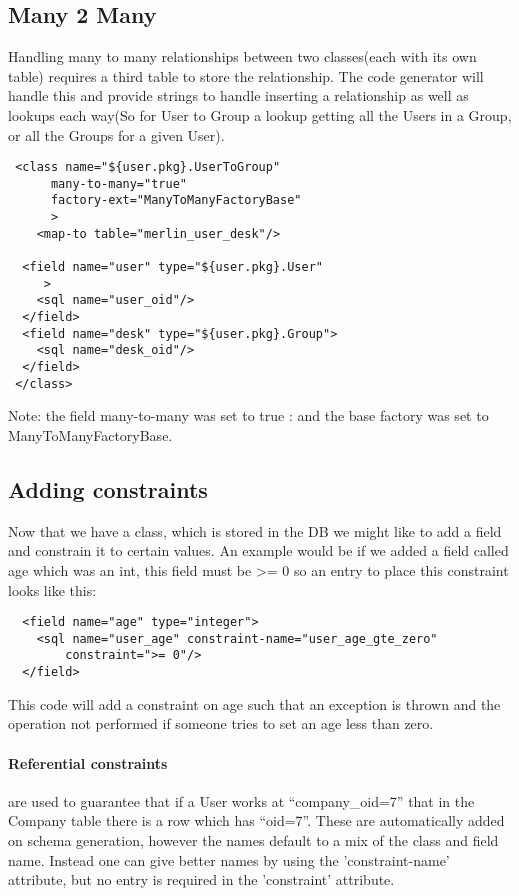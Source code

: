 \documentclass[10pt,openany]{book}
\begin{document}
\subsection{Many 2 Many}
Handling many to many relationships between two classes(each with its own
table) requires a third table to store the relationship.  The code
generator will handle this and provide strings to handle inserting a
relationship as well as lookups each way(So for User to Group a lookup
getting all the Users in a Group, or all the Groups for a given User).
\begin{verbatim}
 <class name="${user.pkg}.UserToGroup" 
      many-to-many="true" 
      factory-ext="ManyToManyFactoryBase"
      >
    <map-to table="merlin_user_desk"/>

  <field name="user" type="${user.pkg}.User"
     >
    <sql name="user_oid"/>
  </field>
  <field name="desk" type="${user.pkg}.Group">
	<sql name="desk_oid"/>
  </field>
 </class>
\end{verbatim}


Note: the field many-to-many was set to true : and the base factory
was set to ManyToManyFactoryBase.

\subsection{Adding constraints}
Now that we have a class, which is stored in the DB we might like
to add a field and constrain it to certain values.  An example would
be if we added a field called age which was an int, this field must be
\textgreater = 0 so an entry to place this constraint looks like this:
\begin{verbatim}
  <field name="age" type="integer">
    <sql name="user_age" constraint-name="user_age_gte_zero"
        constraint=">= 0"/>
  </field>
\end{verbatim}
This code will add a constraint on age such that an exception is
thrown and the operation not performed if someone tries to set an age
less than zero.
\paragraph{Referential constraints} are used to guarantee that if a User works
at ``company\_oid=7'' that in the Company table there is a row which
has ``oid=7''.  These are automatically added on schema generation,
however the names default to a mix of the class and field name.
Instead one can give better names by using the 'constraint-name'
attribute, but no entry is required in the 'constraint' attribute.
\end{document}
